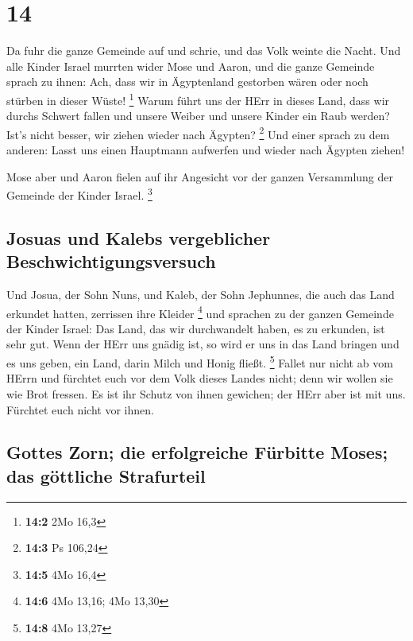 \hypertarget{section-13}{%
\section{14}\label{section-13}}

 Da fuhr die ganze Gemeinde auf und schrie, und das Volk
weinte die Nacht.  Und alle Kinder Israel murrten wider
Mose und Aaron, und die ganze Gemeinde sprach zu ihnen: Ach, dass wir in
Ägyptenland gestorben wären oder noch stürben in dieser Wüste!
\footnote{\textbf{14:2} 2Mo 16,3}  Warum führt uns der
HErr in dieses Land, dass wir durchs Schwert fallen und unsere Weiber
und unsere Kinder ein Raub werden? Ist's nicht besser, wir ziehen wieder
nach Ägypten? \footnote{\textbf{14:3} Ps 106,24}  Und
einer sprach zu dem anderen: Lasst uns einen Hauptmann aufwerfen und
wieder nach Ägypten ziehen!

 Mose aber und Aaron fielen auf ihr Angesicht vor der
ganzen Versammlung der Gemeinde der Kinder Israel. \footnote{\textbf{14:5}
  4Mo 16,4}

\hypertarget{josuas-und-kalebs-vergeblicher-beschwichtigungsversuch}{%
\subsection{Josuas und Kalebs vergeblicher
Beschwichtigungsversuch}\label{josuas-und-kalebs-vergeblicher-beschwichtigungsversuch}}

 Und Josua, der Sohn Nuns, und Kaleb, der Sohn Jephunnes,
die auch das Land erkundet hatten, zerrissen ihre Kleider \footnote{\textbf{14:6}
  4Mo 13,16; 4Mo 13,30}  und sprachen zu der ganzen
Gemeinde der Kinder Israel: Das Land, das wir durchwandelt haben, es zu
erkunden, ist sehr gut.  Wenn der HErr uns gnädig ist, so
wird er uns in das Land bringen und es uns geben, ein Land, darin Milch
und Honig fließt. \footnote{\textbf{14:8} 4Mo 13,27} 
Fallet nur nicht ab vom HErrn und fürchtet euch vor dem Volk dieses
Landes nicht; denn wir wollen sie wie Brot fressen. Es ist ihr Schutz
von ihnen gewichen; der HErr aber ist mit uns. Fürchtet euch nicht vor
ihnen.

\hypertarget{gottes-zorn-die-erfolgreiche-fuxfcrbitte-moses-das-guxf6ttliche-strafurteil}{%
\subsection{Gottes Zorn; die erfolgreiche Fürbitte Moses; das göttliche
Strafurteil}\label{gottes-zorn-die-erfolgreiche-fuxfcrbitte-moses-das-guxf6ttliche-strafurteil}}

